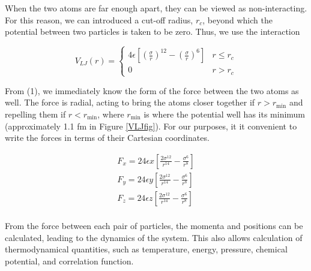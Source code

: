 \documentclass{article}
\begin{document}
\begin{multicols}{2}
When the two atoms are far enough apart, they can be viewed as non-interacting.  For this reason, we can introduced a cut-off radius, $r_c$, beyond which the potential between two particles is taken to be zero.  Thus, we use the interaction 

\begin{equation}
V_{LJ} (r) = \begin{cases}
4 \epsilon \left [ \left (\frac{\sigma}{r} \right )^{12} - \left (\frac{\sigma}{r} \right )^{6} \right ] & r \le r_c \\
0 & r > r_c
\end{cases}
\label{cutoff}
\end{equation}

From (1), we immediately know the form of the force between the two atoms as well.  The force is radial, acting to bring the atoms closer together if $r > r_{\mathrm{min}}$ and repelling them if $r < r_{\mathrm{min}}$, where $r_{\mathrm{min}}$ is where the potential well has its minimum (approximately 1.1 fm in Figure \ref{VLJfig}).  For our purposes, it it convenient to write the forces in terms of their Cartesian coordinates.  

\begin{equation}
\begin{split}
F_x = 24\epsilon x \left [ \frac{2 \sigma ^{12}}{r^{14}} - \frac{\sigma ^{6}}{r^8} \right ] \\
F_y = 24 \epsilon y \left [ \frac{2 \sigma ^{12}}{r^{14}} - \frac{\sigma ^{6}}{r^8} \right ] \\
F_z = 24 \epsilon z \left [ \frac{2 \sigma ^{12}}{r^{14}} - \frac{\sigma ^{6}}{r^8} \right ] \\
\end{split}
\end{equation}

\noindent From the force between each pair of particles, the momenta and positions can be calculated, leading to the dynamics of the system.  This also allows calculation of thermodynamical quantities, such as temperature, energy, pressure, chemical potential, and correlation function.\\


\end{multicols}
\end{document}
